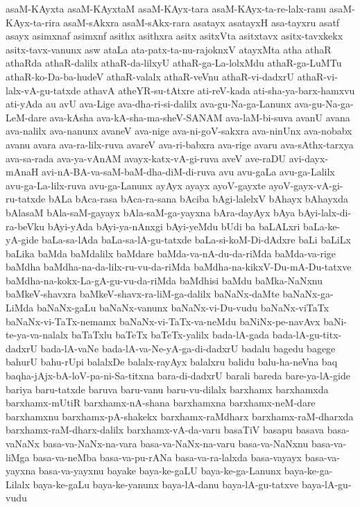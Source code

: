 {asaM-KAyxta
asaM-KAyxtaM
asaM-KAyx-tara
asaM-KAyx-ta-re-lalx-ranu
asaM-KAyx-ta-rira
asaM-sAkxra
asaM-sAkx-rara
asatayx
asatayxH
asa-tayxru
asatf
asayx
asimxnaf
asimxnf
asithx
asithxra
asitx
asitxVta
asitxtavx
asitx-tavxkekx
asitx-tavx-vanunx
asw
ataLa
ata-patx-ta-nu-rajoknxV
atayxMta
atha
athaR
athaRda
athaR-dalilx
athaR-da-lilxyU
athaR-ga-La-lolxMdu
athaR-ga-LuMTu
athaR-ko-Da-ba-hudeV
athaR-valalx
athaR-veVnu
athaR-vi-dadxrU
athaR-vi-lalx-vA-gu-tatxde
athavA
atheYR-su-tAtxre
ati-reV-kada
ati-sha-ya-barx-hamxvu
ati-yAda
au
avU
ava-Lige
ava-dha-ri-si-dalilx
ava-gu-Na-ga-Lanunx
ava-gu-Na-ga-LeM-dare
ava-kAsha
ava-kA-sha-ma-sheV-SANAM
ava-laM-bi-suva
avanU
avana
ava-nalilx
ava-nanunx
avaneV
ava-nige
ava-ni-goV-sakxra
ava-ninUnx
ava-nobabx
avanu
avara
ava-ra-lilx-ruva
avareV
ava-ri-babxra
ava-rige
avaru
ava-sAthx-tarxya
ava-sa-rada
ava-ya-vAnAM
avayx-katx-vA-gi-ruva
aveV
ave-raDU
avi-dayx-mAnaH
avi-nA-BA-va-saM-baM-dha-diM-di-ruva
avu
avu-gaLa
avu-ga-Lalilx
avu-ga-La-lilx-ruva
avu-ga-Lanunx
ayAyx
ayayx
ayoV-gayxte
ayoV-gayx-vA-gi-ru-tatxde
bALa
bAca-rasa
bAca-ra-sana
bAciba
bAgi-lalelxV
bAhayx
bAhayxda
bAlasaM
bAla-saM-gayayx
bAla-saM-ga-yayxna
bAra-dayAyx
bAya
bAyi-lalx-di-ra-beVku
bAyi-yAda
bAyi-ya-nAnxgi
bAyi-yeMdu
bUdi
ba
baLALxri
baLa-ke-yA-gide
baLa-sa-lAda
baLa-sa-lA-gu-tatxde
baLa-si-koM-Di-dAdxre
baLi
baLiLx
baLika
baMda
baMdalilx
baMdare
baMda-va-nA-du-da-riMda
baMda-va-rige
baMdha
baMdha-na-da-lilx-ru-vu-da-riMda
baMdha-na-kikxV-Du-mA-Du-tatxve
baMdha-na-kokx-La-gA-gu-vu-da-riMda
baMdhisi
baMdu
baMka-NaNxnu
baMkeV-shavxra
baMkeV-shavx-ra-liM-ga-dalilx
baNaNx-daMte
baNaNx-ga-LiMda
baNaNx-gaLu
baNaNx-vanunx
baNaNx-vi-Du-vudu
baNaNx-viTaTx
baNaNx-vi-TaTx-nemamx
baNaNx-vi-TaTx-va-neMdu
baNiNx-pe-navAvx
baNi-te-ya-va-nalalx
baTaTxlu
baTeTx
baTeTx-yalilx
bada-lA-gada
bada-lA-gu-titx-dadxrU
bada-lA-vaNe
bada-lA-va-Ne-yA-ga-di-dadxrU
badalu
bagedu
bagege
bahurU
bahu-rUpi
balalxDe
balalx-rayAyx
balalxru
balidu
balu-ha-neVna
baq
baqha-jAjx-bA-loV-pa-ni-Sa-titxna
bara-di-dadxrU
barali
bareda
bare-ya-lA-gide
bariya
baru-tatxde
baruva
baru-vanu
baru-vu-dilalx
barxhamx
barxhamxda
barxhamx-mUtiR
barxhamx-nA-shana
barxhamxna
barxhamx-neM-dare
barxhamxnu
barxhamx-pA-shakekx
barxhamx-raMdharx
barxhamx-raM-dharxda
barxhamx-raM-dharx-dalilx
barxhamx-vA-da-varu
basaTiV
basapu
basava
basa-vaNaNx
basa-va-NaNx-na-vara
basa-va-NaNx-na-varu
basa-va-NaNxnu
basa-va-liMga
basa-va-neMba
basa-va-pu-rANa
basa-va-ra-lalxda
basa-vayayx
basa-va-yayxna
basa-va-yayxnu
bayake
baya-ke-gaLU
baya-ke-ga-Lanunx
baya-ke-ga-Lilalx
baya-ke-gaLu
baya-ke-yanunx
baya-lA-danu
baya-lA-gu-tatxve
baya-lA-gu-vudu
}
